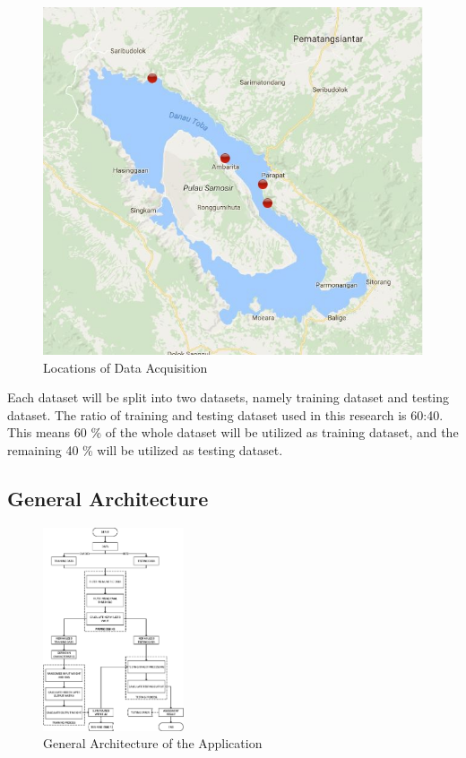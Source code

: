 \documentclass[journal,comsoc]{IEEEtran}
\let\MYoriglatexcaption\caption
\renewcommand{\caption}[2][\relax]{\MYoriglatexcaption[#2]{#2}}
\begin{document}
\begin{figure}[!th]
\centering
\includegraphics[scale=0.2]{map_data_acquisition.jpg}
\caption{Locations of Data Acquisition \cite{Rahmat16}}
\label{fig1}
\end{figure}

Each dataset will be split into two datasets, namely training dataset and testing dataset. The ratio of training and testing dataset used in this research is 60:40. This means 60 \% of the whole dataset will be utilized as training dataset, and the remaining 40 \% will be utilized as testing dataset.

\subsection{General Architecture}

\begin{figure}[H]
\centering
\includegraphics[width=0.8\columnwidth,height=60mm]{ArsitekturUmum-Redesigned-Remastered.eps}
\caption{General Architecture of the Application}
\label{fig2}
\end{figure}
\end{document}
